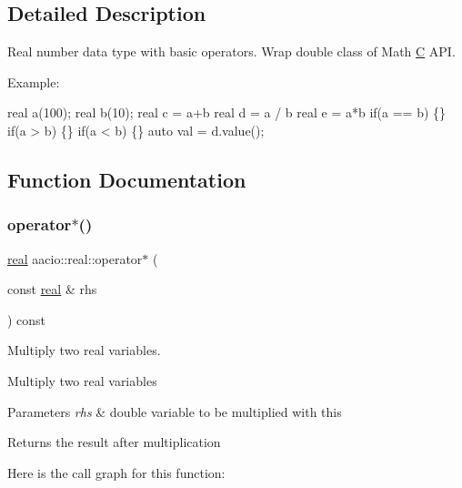 \subsection{Detailed Description}
Real number data type with basic operators. Wrap double class of Math \mbox{\hyperlink{struct_c}{C}} A\+PI. 

Example\+: 
\begin{DoxyCode}
real a(100);
real b(10);
real c = a+b
real d = a / b
real e = a*b
\textcolor{keywordflow}{if}(a == b) \{\}
\textcolor{keywordflow}{if}(a > b) \{\}
\textcolor{keywordflow}{if}(a < b) \{\}
\textcolor{keyword}{auto} val = d.value();
\end{DoxyCode}
 

\subsection{Function Documentation}
\mbox{\label{group__real_gaf2078aa77b91b501d0f4c068c0a9c8fe}} 
\subsubsection{\texorpdfstring{operator$\ast$()}{operator*()}}
{\footnotesize\ttfamily \mbox{\hyperlink{classaacio_1_1real}{real}} aacio\+::real\+::operator$\ast$ (\begin{DoxyParamCaption}\item[{const \mbox{\hyperlink{classaacio_1_1real}{real}} \&}]{rhs }\end{DoxyParamCaption}) const}



Multiply two real variables. 

Multiply two real variables 
\begin{DoxyParams}{Parameters}
{\em rhs} & double variable to be multiplied with this \\
\hline
\end{DoxyParams}
\begin{DoxyReturn}{Returns}
the result after multiplication 
\end{DoxyReturn}
Here is the call graph for this function\+:
\mbox{\label{group__real_gad6bd588e0aa69227458b61d2ca48bacc}} 
